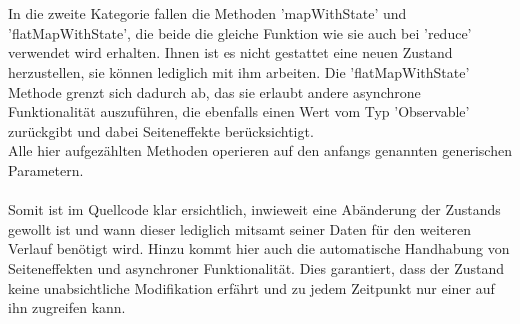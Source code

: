 \\\\
In die zweite Kategorie fallen die Methoden 'mapWithState' und 'flatMapWithState', die beide die gleiche Funktion wie sie auch bei 'reduce' verwendet wird erhalten. Ihnen ist es nicht gestattet eine neuen Zustand herzustellen, sie können lediglich mit ihm arbeiten. Die 'flatMapWithState' Methode grenzt sich dadurch ab, das sie erlaubt andere asynchrone Funktionalität auszuführen, die ebenfalls einen Wert vom Typ 'Observable' zurückgibt und dabei Seiteneffekte berücksichtigt.
\\
Alle hier aufgezählten Methoden operieren auf den anfangs genannten generischen Parametern. 
\\\\
Somit ist im Quellcode klar ersichtlich, inwieweit eine Abänderung der Zustands gewollt ist und wann dieser lediglich mitsamt seiner Daten für den weiteren Verlauf benötigt wird. Hinzu kommt hier auch die automatische Handhabung von Seiteneffekten und asynchroner Funktionalität. Dies garantiert, dass der Zustand keine unabsichtliche Modifikation erfährt und zu jedem Zeitpunkt nur einer auf ihn zugreifen kann.


